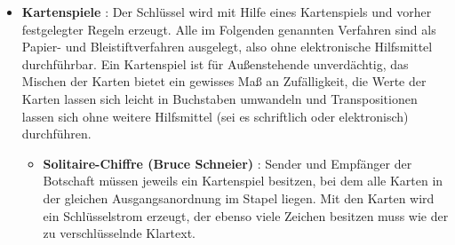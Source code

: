 \begin{refsegment}
\begin{itemize}
\item {\bf Kartenspiele} \cite{Savard1999}:
   Der Schlüssel wird mit Hilfe eines Kartenspiels und vorher festgelegter
   Regeln erzeugt. Alle im Folgenden genannten Verfahren sind als
   Papier- und Bleistiftverfahren ausgelegt, also ohne elektronische
   Hilfsmittel durchführbar. Ein Kartenspiel ist für Außenstehende
   unverdächtig, das Mischen der Karten bietet ein gewisses Maß an
   Zufälligkeit, die Werte der Karten lassen sich leicht in Buchstaben
   umwandeln und Transpositionen lassen sich ohne weitere Hilfsmittel
   (sei es schriftlich oder elektronisch) durchführen.
   \begin{itemize}
      \item {\bf Solitaire-Chiffre (Bruce Schneier)\footnotemark}
         \cite{Schneier1999}:
         Sender und Empfänger der Botschaft müssen jeweils ein Kartenspiel
         besitzen, bei dem alle Karten in der gleichen Ausgangsanordnung
         im Stapel liegen. Mit den Karten wird ein Schlüsselstrom erzeugt,
         der ebenso viele Zeichen besitzen muss wie der zu verschlüsselnde
         Klartext.


\end{itemize}
\end{itemize}
\end{refsegment}
